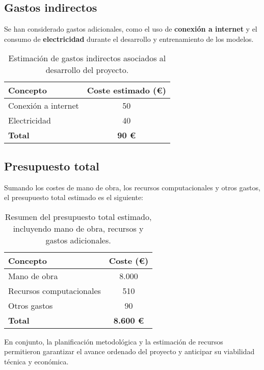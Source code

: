 \subsection{Gastos indirectos}\label{subsec:gastos-indirectos}
Se han considerado gastos adicionales, como el uso de \textbf{conexión a internet} y el consumo de
\textbf{electricidad} durante el desarrollo y entrenamiento de los modelos.

\begin{table}[htp]\label{tab:gastos-indirectos}
    \centering
    \begin{tabular}{|l|c|}
        \hline
        \textbf{Concepto}   & \textbf{Coste estimado (€)} \\ \hline
        Conexión a internet & 50                          \\
        Electricidad        & 40                          \\ \hline
        \textbf{Total}      & \textbf{90 €}               \\ \hline
    \end{tabular}
    \caption{Estimación de gastos indirectos asociados al desarrollo del proyecto.}
\end{table}


\subsection{Presupuesto total}\label{subsec:presupuesto-total}
Sumando los costes de mano de obra, los recursos computacionales y otros gastos, el presupuesto total estimado es el
siguiente:

\begin{table}[htp]\label{tab:presupuesto-total}
    \centering
    \begin{tabular}{|l|c|}
        \hline
        \textbf{Concepto}        & \textbf{Coste (€)} \\ \hline
        Mano de obra             & 8.000              \\
        Recursos computacionales & 510                \\
        Otros gastos             & 90                 \\ \hline
        \textbf{Total}           & \textbf{8.600 €}   \\ \hline
    \end{tabular}
    \caption{Resumen del presupuesto total estimado, incluyendo mano de obra, recursos y gastos adicionales.}
\end{table}

\newpage
En conjunto, la planificación metodológica y la estimación de recursos permitieron garantizar el avance
ordenado del proyecto y anticipar su viabilidad técnica y económica.
